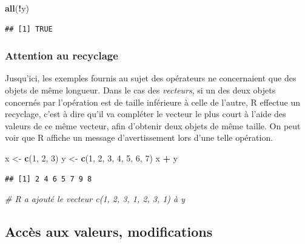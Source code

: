 \documentclass[
  11pt,
]{book}
\newenvironment{Shaded}{\begin{snugshade}}{\end{snugshade}}
\newcommand{\CommentTok}[1]{\textcolor[rgb]{0.56,0.35,0.01}{\textit{#1}}}
\newcommand{\DecValTok}[1]{\textcolor[rgb]{0.00,0.00,0.81}{#1}}
\newcommand{\KeywordTok}[1]{\textcolor[rgb]{0.13,0.29,0.53}{\textbf{#1}}}
\newcommand{\NormalTok}[1]{#1}
\newcommand{\OperatorTok}[1]{\textcolor[rgb]{0.81,0.36,0.00}{\textbf{#1}}}
\newcommand{\StringTok}[1]{\textcolor[rgb]{0.31,0.60,0.02}{#1}}
\numberwithin{equation}{section}
\numberwithin{countremarque}{section}
\begin{document}
\begin{Shaded}
\begin{Highlighting}[]
\KeywordTok{all}\NormalTok{(}\OperatorTok{!}\NormalTok{y)}
\end{Highlighting}
\end{Shaded}

\begin{lstlisting}
## [1] TRUE
\end{lstlisting}

\hypertarget{attention-au-recyclage}{%
\subsubsection{Attention au recyclage}\label{attention-au-recyclage}}

Jusqu'ici, les exemples fournis au sujet des opérateurs ne concernaient que des objets de même longueur. Dans le cas des \emph{vecteurs}, si un des deux objets concernés par l'opération est de taille inférieure à celle de l'autre, R effectue un recyclage, c'est à dire qu'il va compléter le vecteur le plus court à l'aide des valeurs de ce même vecteur, afin d'obtenir deux objets de même taille. On peut voir que R affiche un message d'avertissement lors d'une telle opération.

\begin{Shaded}
\begin{Highlighting}[]
\NormalTok{x \textless{}{-}}\StringTok{ }\KeywordTok{c}\NormalTok{(}\DecValTok{1}\NormalTok{, }\DecValTok{2}\NormalTok{, }\DecValTok{3}\NormalTok{)}
\NormalTok{y \textless{}{-}}\StringTok{ }\KeywordTok{c}\NormalTok{(}\DecValTok{1}\NormalTok{, }\DecValTok{2}\NormalTok{, }\DecValTok{3}\NormalTok{, }\DecValTok{4}\NormalTok{, }\DecValTok{5}\NormalTok{, }\DecValTok{6}\NormalTok{, }\DecValTok{7}\NormalTok{)}
\NormalTok{x }\OperatorTok{+}\StringTok{ }\NormalTok{y}
\end{Highlighting}
\end{Shaded}

\begin{lstlisting}
## [1] 2 4 6 5 7 9 8
\end{lstlisting}

\begin{Shaded}
\begin{Highlighting}[]
\CommentTok{\# R a ajouté le vecteur c(1, 2, 3, 1, 2, 3, 1) à y}
\end{Highlighting}
\end{Shaded}

\hypertarget{manip-acces}{%
\subsection{Accès aux valeurs, modifications}\label{manip-acces}}
\end{document}
